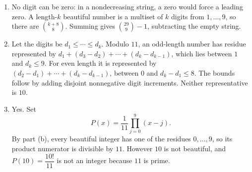 \begin{enumerate}
\item No digit can be zero: in a nondecreasing string, a zero would force a leading zero. A length-$k$ beautiful number is a multiset of $k$ digits from $1,\ldots,9$, so there are $\binom{k+8}{8}$. Summing gives $\boxed{\binom{29}{9}-1}$, subtracting the empty string.
\item Let the digits be $d_1\le\cdots\le d_k$. Modulo $11$, an odd-length number has residue represented by
$d_1+(d_3-d_2)+\cdots+(d_k-d_{k-1})$, which lies between $1$ and $d_k\le9$. For even length it is represented by $(d_2-d_1)+\cdots+(d_k-d_{k-1})$, between $0$ and $d_k-d_1\le8$. The bounds follow by adding disjoint nonnegative digit increments. Neither representative is $10$.
\item Yes. Set
\[
\boxed{P(x)=\dfrac{1}{11}\prod_{j=0}^{9}(x-j)}.
\]
By part (b), every beautiful integer has one of the residues $0,\ldots,9$, so its product numerator is divisible by $11$. However $10$ is not beautiful, and $P(10)=\dfrac{10!}{11}$ is not an integer because $11$ is prime.
\end{enumerate}
